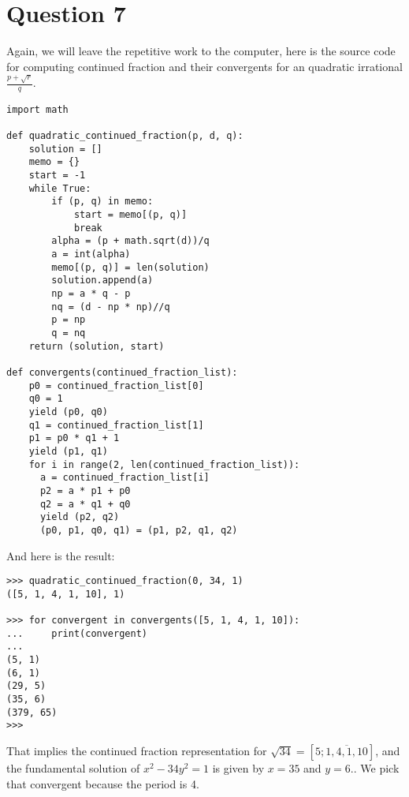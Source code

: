 \documentclass{article}
\begin{document}
\section*{Question 7}
Again, we will leave the repetitive work to the computer, here is the source code for computing continued fraction and their convergents for an quadratic irrational $ \frac{p + \sqrt{r}}{q} $.
\begin{verbatim}
import math

def quadratic_continued_fraction(p, d, q):
    solution = []
    memo = {}
    start = -1
    while True:
        if (p, q) in memo:
            start = memo[(p, q)]
            break
        alpha = (p + math.sqrt(d))/q
        a = int(alpha)
        memo[(p, q)] = len(solution)
        solution.append(a)
        np = a * q - p
        nq = (d - np * np)//q
        p = np
        q = nq
    return (solution, start)

def convergents(continued_fraction_list):
    p0 = continued_fraction_list[0]
    q0 = 1
    yield (p0, q0)
    q1 = continued_fraction_list[1]
    p1 = p0 * q1 + 1
    yield (p1, q1)
    for i in range(2, len(continued_fraction_list)):
      a = continued_fraction_list[i]
      p2 = a * p1 + p0
      q2 = a * q1 + q0
      yield (p2, q2)
      (p0, p1, q0, q1) = (p1, p2, q1, q2)
\end{verbatim}

And here is the result:
\begin{verbatim}
>>> quadratic_continued_fraction(0, 34, 1)
([5, 1, 4, 1, 10], 1)

>>> for convergent in convergents([5, 1, 4, 1, 10]):
...     print(convergent)
...
(5, 1)
(6, 1)
(29, 5)
(35, 6)
(379, 65)
>>>
\end{verbatim}

That implies the continued fraction representation for $ \sqrt{34} = [5;\overline{1,4,1,10}] $, and the fundamental solution of $ x^2 - 34y^2 = 1 $ is given by $ x = 35 $ and $ y = 6. $. We pick that convergent because the period is 4.
\end{document}
